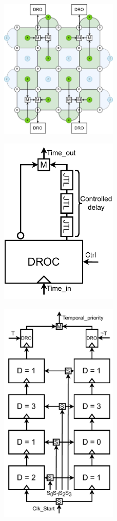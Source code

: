 \documentclass[conference]{IEEEtran}
\begin{document}
\begin{figure}[h!]
  \includegraphics[width=0.5\textwidth]{figures/mtree.drawio.pdf}
  \caption{}
  \label{fig:mtree}
\end{figure}

\begin{figure}[h!]
  \includegraphics[width=0.5\textwidth]{figures/delay_block.drawio.pdf}
  \caption{}
  \label{fig:delblock}
\end{figure}

\begin{figure}[h!]
  \includegraphics[width=0.5\textwidth]{figures/temporal_encoder.drawio.pdf}
  \caption{}
  \label{fig:tempenc}
\end{figure}
\end{document}
